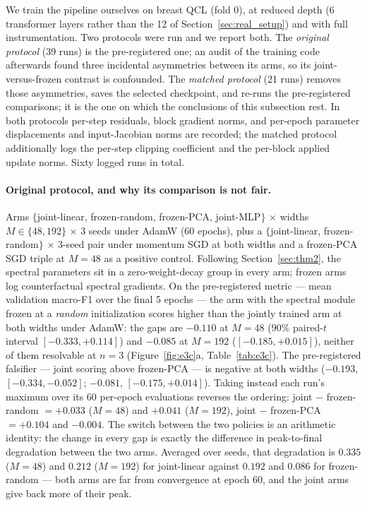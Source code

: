 We train the pipeline ourselves on breast QCL (fold 0), at reduced
depth (6 transformer layers rather than the 12 of
Section~\ref{sec:real_setup}) and with full instrumentation. Two
protocols were run and we report both. The \emph{original protocol}
(39 runs) is the pre-registered one; an audit of the training code
afterwards found three incidental asymmetries between its arms, so its
joint-versus-frozen contrast is confounded. The \emph{matched
protocol} (21 runs) removes those asymmetries, saves the selected
checkpoint, and re-runs the pre-registered comparisons; it is the one
on which the conclusions of this subsection rest. In both protocols
per-step residuals, block gradient norms, and per-epoch parameter
displacements and input-Jacobian norms are recorded; the matched
protocol additionally logs the per-step clipping coefficient and the
per-block applied update norms. Sixty logged runs in total.

\paragraph{Original protocol, and why its comparison is not fair.}
Arms $\{$joint-linear, frozen-random, frozen-PCA, joint-MLP$\}$
$\times$ widths $M \in \{48, 192\}$ $\times$ 3 seeds under AdamW
(60 epochs), plus a $\{$joint-linear, frozen-random$\}$ $\times$
3-seed pair under momentum SGD at both widths and a frozen-PCA SGD
triple at $M{=}48$ as a positive control. Following
Section~\ref{sec:thm2}, the spectral parameters sit in a
zero-weight-decay group in every arm; frozen arms log counterfactual
spectral gradients. On the pre-registered metric --- mean validation
macro-F1 over the final 5 epochs --- the arm with the spectral module
frozen at a \emph{random} initialization scores higher than the jointly
trained arm at both widths under AdamW: the gaps are $-0.110$ at
$M{=}48$ ($90\%$ paired-$t$ interval $[-0.333, +0.114]$) and $-0.085$
at $M{=}192$ ($[-0.185, +0.015]$), neither of them resolvable at $n=3$
(Figure~\ref{fig:e3c}a, Table~\ref{tab:e3c}). The pre-registered
falsifier --- joint scoring above frozen-PCA --- is negative at both
widths ($-0.193$, $[-0.334, -0.052]$; $-0.081$, $[-0.175, +0.014]$).
Taking instead each run's maximum over its 60
per-epoch evaluations reverses the ordering: joint $-$ frozen-random
$= +0.033$ ($M{=}48$) and $+0.041$ ($M{=}192$), joint $-$ frozen-PCA
$= +0.104$ and $-0.004$. The switch between the two policies is an
arithmetic identity: the change in every gap is exactly the difference
in peak-to-final degradation between the two arms. Averaged over
seeds, that degradation is $0.335$ ($M{=}48$) and $0.212$ ($M{=}192$)
for joint-linear against $0.192$ and $0.086$ for frozen-random --- both
arms are far from convergence at epoch 60, and the joint arms give
back more of their peak.

